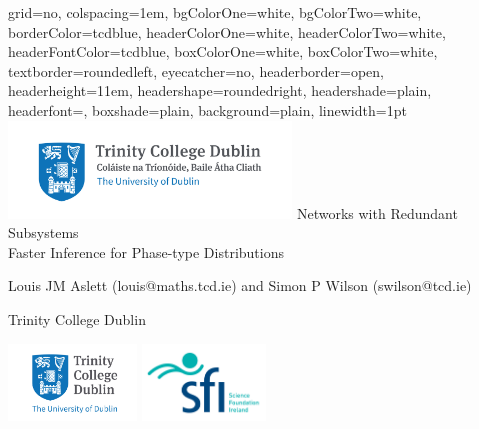 \documentclass[final,a1paper]{baposter}
\begin{document}
\newlength{\leftimgwidth}
\begin{poster}%
  {
  grid=no,
  colspacing=1em,
  bgColorOne=white,
  bgColorTwo=white,
  borderColor=tcdblue,
  headerColorOne=white,
  headerColorTwo=white,
  headerFontColor=tcdblue,
  boxColorOne=white,
  boxColorTwo=white,
  textborder=roundedleft,
  eyecatcher=no,
  headerborder=open,
  headerheight=11em, %
  headershape=roundedright,
  headershade=plain,
  headerfont=\Large,
  boxshade=plain,
  background=plain,
  linewidth=1pt
  }
  {\includegraphics[height=7em]{trinity-common-use.jpg}} %
  {{\huge Networks with Redundant Subsystems}\\{\LARGE Faster Inference for Phase-type Distributions}}
  {
  
  \vspace{-1.5em}
  Louis JM Aslett {\smaller (louis@maths.tcd.ie)} and Simon P Wilson {\smaller (swilson@tcd.ie)}
  
  \vspace{0.2em}
  Trinity College Dublin
  }
  {
      \begin{minipage}{19em}
       \hfill
        \includegraphics[height=5.5em]{trinity-stacked.jpg}
        \includegraphics[height=5.5em]{SFI_logo_stacked_en.jpg}
      \end{minipage}
  }


\end{poster}
\end{document}
